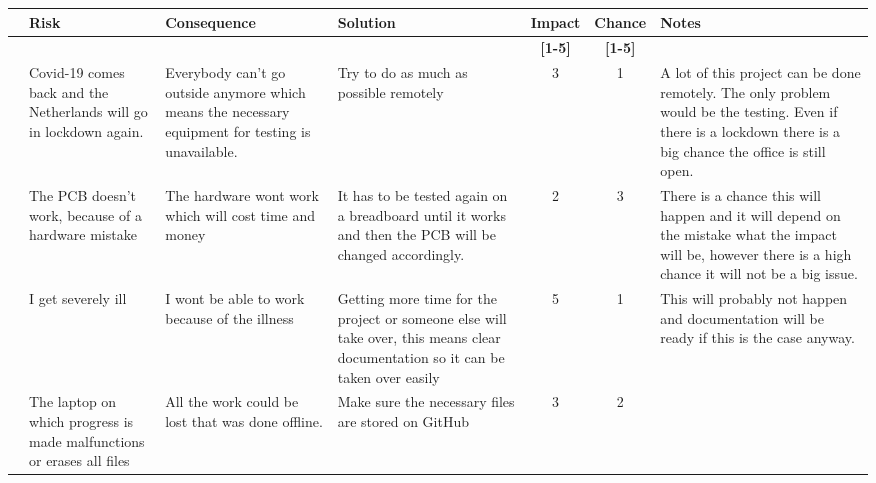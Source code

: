 \begin{longtable}{| c | p{3cm} | p{3cm} | p{4cm} | c | c | p{3cm} |}
    \hline
    \rowcolor{teal} & \textbf{Risk} & \textbf{Consequence} & \textbf{Solution} & \textbf{Impact} & \textbf{Chance} & \cellcolor{lightgray}\textbf{Notes} \\\hline
    \rowcolor{teal}& & & & \textbf{[1-5]} & \textbf{[1-5]} &\cellcolor{lightgray} \\\hline
    \rowcolor{cyan}\theriskTableCounter{} &
    \stepcounter{riskTableCounter}
    Covid-19 comes back and the Netherlands will go in lockdown again.& Everybody can't go outside anymore which means the necessary equipment for testing is unavailable. & 
    Try to do as much as possible remotely &
    \cellcolor{yellow}3 &
    \cellcolor{green}1 &
    \cellcolor{lightgray}A lot of this project can be done remotely. The only problem would be the testing. Even if there is a lockdown there is a big chance the office is still open. 
    \\ \hline
    \rowcolor{teal}\theriskTableCounter{} &
    \stepcounter{riskTableCounter}
    The PCB doesn't work, because of a hardware mistake&
    The hardware wont work which will cost time and money&
    It has to be tested again on a breadboard until it works and then the PCB will be changed accordingly. &
    \cellcolor{lime}2&
    \cellcolor{yellow}3&
    \cellcolor{lightgray}There is a chance this will happen and it will depend on the mistake what the impact will be, however there is a high chance it will not be a big issue.
    \\\hline
    \rowcolor{cyan}\theriskTableCounter{} &
    \stepcounter{riskTableCounter}
    I get severely ill & 
    I wont be able to work because of the illness &
    Getting more time for the project or someone else will take over, this means clear documentation so it can be taken over easily &
    \cellcolor{red}5 &
    \cellcolor{green}1 &
    \cellcolor{lightgray}This will probably not happen and documentation will be ready if this is the case anyway.
    \\ \hline
    \rowcolor{teal}\theriskTableCounter{} &
    \stepcounter{riskTableCounter}
    The laptop on which progress is made malfunctions or erases all files&
    All the work could be lost that was done offline. &
    Make sure the necessary files are stored on GitHub& 
    \cellcolor{yellow}3&
    \cellcolor{lime}2&

\end{longtable}
